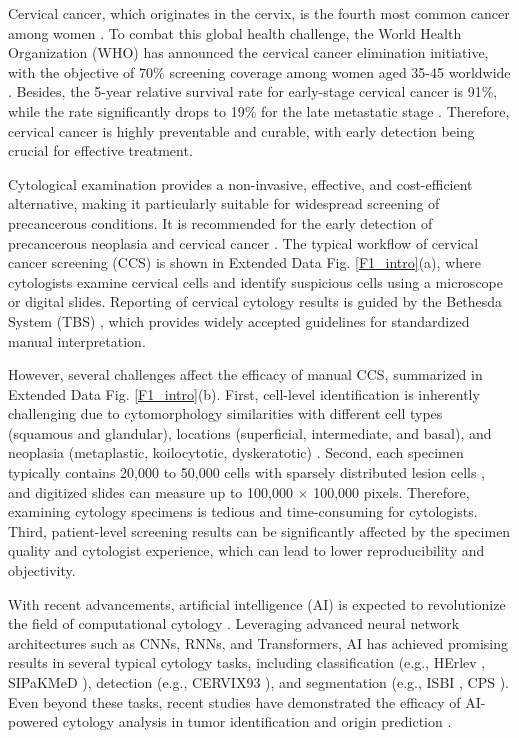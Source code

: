 Cervical cancer, which originates in the cervix, is the fourth most common cancer among women \cite{siegel2024cancer, siegel2023cancer, cohen2019cervical, denny2024cervical}. 
To combat this global health challenge, the World Health Organization (WHO) has announced the cervical cancer elimination initiative, with the objective of 70\% screening coverage among women aged 35-45 worldwide \cite{world2020global}.
Besides, the 5-year relative survival rate for early-stage cervical cancer is 91\%, while the rate significantly drops to 19\% for the late metastatic stage \cite{ref_NCI1}. Therefore, cervical cancer is highly preventable and curable, with early detection being crucial for effective treatment. 

Cytological examination provides a non-invasive, effective, and cost-efficient alternative, making it particularly suitable for widespread screening of precancerous conditions. It is recommended for the early detection of precancerous neoplasia and cervical cancer \cite{kim2023smart,ouh2021discrepancy}. The typical workflow of cervical cancer screening (CCS) is shown in Extended Data Fig. \ref{F1_intro}(a), where cytologists examine cervical cells and identify suspicious cells using a microscope or digital slides. Reporting of cervical cytology results is guided by the Bethesda System (TBS) \cite{nayar2015bethesda}, which provides widely accepted guidelines for standardized manual interpretation. 

However, several challenges affect the efficacy of manual CCS, summarized in Extended Data Fig. \ref{F1_intro}(b). First, cell-level identification is inherently challenging due to cytomorphology similarities with different cell types (squamous and glandular), locations (superficial, intermediate, and basal), and neoplasia (metaplastic, koilocytotic, dyskeratotic) \cite{plissiti2018sipakmed}. Second, each specimen typically contains 20,000 to 50,000 cells with sparsely distributed lesion cells \cite{lin2021dual}, and digitized slides can measure up to 100,000 $\times$ 100,000 pixels. Therefore, examining cytology specimens is tedious and time-consuming for cytologists. Third, patient-level screening results can be significantly affected by the specimen quality and cytologist experience, which can lead to lower reproducibility and objectivity.

With recent advancements, artificial intelligence (AI) is expected to revolutionize the field of computational cytology \cite{jiang2023deep}. Leveraging advanced neural network architectures such as CNNs, RNNs, and Transformers, AI has achieved promising results in several typical cytology tasks, including classification (e.g., HErlev \cite{jantzen2005pap}, SIPaKMeD \cite{plissiti2018sipakmed}), detection (e.g., CERVIX93 \cite{phoulady2018new}), and segmentation (e.g., ISBI \cite{lu2015improved}, CPS \cite{jiang2023donet,liu2024gains}). Even beyond these tasks, recent studies have demonstrated the efficacy of AI-powered cytology analysis in tumor identification and origin prediction \cite{tian2024prediction}.

